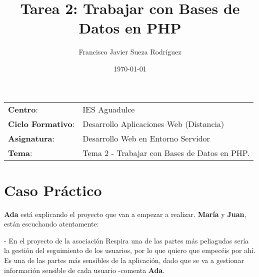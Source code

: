 


\title{
\vspace{10ex}
\normalfont \normalsize
\huge \textbf{Tarea 2: Trabajar con Bases de Datos en PHP}
}
\author{Francisco Javier Sueza Rodríguez}
\date{\normalsize\today}



\maketitle

\thispagestyle{empty}

\vspace{65ex}

\begin{center}
    \begin{tabular}{l l}
        \textbf{Centro}: & IES Aguadulce \\
        \textbf{Ciclo Formativo}: & Desarrollo Aplicaciones Web (Distancia)\\
        \textbf{Asignatura}: & Desarrollo Web en Entorno Servidor\\
        \textbf{Tema}: & Tema 2 -  Trabajar con Bases de Datos en PHP.\\
    \end{tabular}
\end{center}

\newpage

\section{Caso Práctico}
\textbf{Ada} está explicando el proyecto que van a empezar a realizar. \textbf{María} y \textbf{Juan}, están escuchando atentamente:

- En el proyecto de la asociación Respira una de las partes más peliagudas sería la gestión del seguimiento de los usuarios, por lo que quiero que empecéis por ahí. Es una de las partes más sensibles de la aplicación, dado que se va a gestionar información sensible de cada usuario -comenta \textbf{Ada}.

